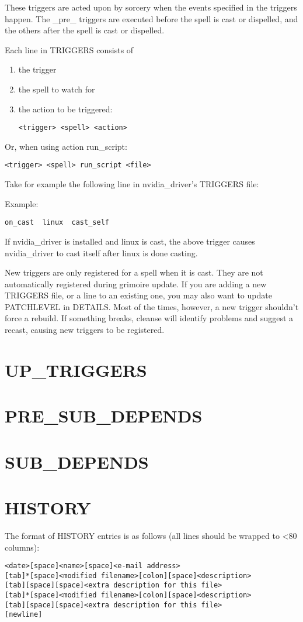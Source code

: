 \documentclass[a4paper,10pt]{book}
\begin{document}
These triggers are acted upon by sorcery when the events specified in the
triggers happen. The \_pre\_ triggers are executed before the spell is cast or
dispelled, and the others after the spell is cast or dispelled.

Each line in TRIGGERS consists of
\begin{enumerate}
\item the trigger
\item the spell to watch for
\item the action to be triggered:
\begin{verbatim}
<trigger> <spell> <action>
\end{verbatim}
\end{enumerate}

Or, when using action run\_script:
\begin{verbatim}
<trigger> <spell> run_script <file>
\end{verbatim}

Take for example the following line in nvidia\_driver's TRIGGERS file:

Example:
\begin{verbatim}
on_cast  linux  cast_self
\end{verbatim}

If nvidia\_driver is installed and linux is cast, the above trigger causes
nvidia\_driver to cast itself after linux is done casting.

New triggers are only registered for a spell when it is cast. They are not
automatically registered during grimoire update. If you are adding a new
TRIGGERS file, or a line to an existing one, you may also want to update
PATCHLEVEL in DETAILS. Most of the times, however, a new trigger shouldn't
force a rebuild. If something breaks, cleanse will identify problems and
suggest a recast, causing new triggers to be registered.

\section{UP\_TRIGGERS}
\section{PRE\_SUB\_DEPENDS}
\section{SUB\_DEPENDS}
\section{HISTORY}
The format of HISTORY entries is as follows (all lines should be wrapped
to <80 columns):
\begin{verbatim}
<date>[space]<name>[space]<e-mail address>
[tab]*[space]<modified filename>[colon][space]<description>
[tab][space][space]<extra description for this file>
[tab]*[space]<modified filename>[colon][space]<description>
[tab][space][space]<extra description for this file>
[newline]
\end{verbatim}
\end{document}
